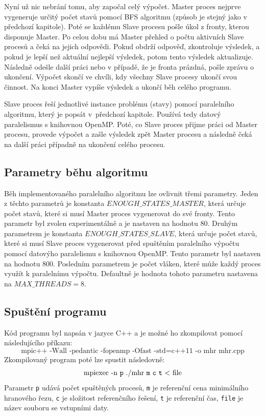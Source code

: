 \documentclass{article}
\begin{document}
Nyní už nic nebrání tomu, aby započal celý výpočet. Master proces nejprve vygeneruje určitý počet stavů pomocí BFS algoritmu (způsob je stejný jako v předchozí kapitole). Poté se každému Slave procesu pošle úkol z fronty, kterou disponuje Master. Po celou dobu má Master přehled o počtu aktivních Slave procesů a čeká na jejich odpovědi. Pokud obdrží odpověď, zkontroluje výsledek, a pokud je lepší než aktuální nejlepší výsledek, potom tento výsledek aktualizuje. Následně odešle další práci nebo v případě, že je fronta prázdná, pošle zprávu o ukončení. Výpočet skončí ve chvíli, kdy všechny Slave procesy ukončí svou činnost. Na konci Master vypíše výsledek a ukončí běh celého programu.

Slave proces řeší jednotlivé instance problému (stavy) pomocí paralelního algoritmu, který je popsát v~předchozí kapitole. Používá tedy datový paralelismus s knihovnou OpenMP. Poté, co Slave proces přijme práci od Master procesu, provede výpočet a zašle výsledek zpět Master procesu a následně čeká na další práci případně na ukončení celého procesu.

\subsection{Parametry běhu algoritmu}
Běh implementovaného paralelního algoritmu lze ovlivnit třemi parametry. Jeden z těchto parametrů je konstanta $ENOUGH\_STATES\_MASTER$, která určuje počet stavů, které si musí Master proces vygenerovat do své fronty. Tento parametr byl zvolen experimentálně a je nastaven na hodnotu 80. Druhým parametrem je konstanta $ENOUGH\_STATES\_SLAVE$, která určuje počet stavů, které si musí Slave proces vygenerovat před spuštěním paralelního výpočtu pomocí datovýho paralelismu s knihovnou OpenMP. Tento parametr byl nastaven na hodnotu 800. Posledním parametrem je počet vláken, které může každý proces využít k paralelnímu výpočtu. Defaultně je hodnota tohoto parametru nastavena na $MAX\_THREADS = 8$.


\subsection{Spuštění programu}
Kód programu byl napsán v jazyce C++ a je možné ho zkompilovat pomocí následujícího příkazu: $$\text{mpic++ -Wall -pedantic -fopenmp -Ofast -std=c++11 -o mhr mhr.cpp}$$ 
Zkompilovaný program poté lze spustit následovně:
$$\text{mpiexec -n \texttt{p}  ./mhr \texttt{m} \texttt{c} \texttt{t} \textless \ file}$$
Parametr \texttt{p} udává počet spuštěných procesů, \texttt{m} je referenční cena minimálního hranového řezu, \texttt{c} je složitost referenčního řešení, \texttt{t} je referenční čas, \texttt{file} je název souboru se vstupními daty. 
\end{document}
